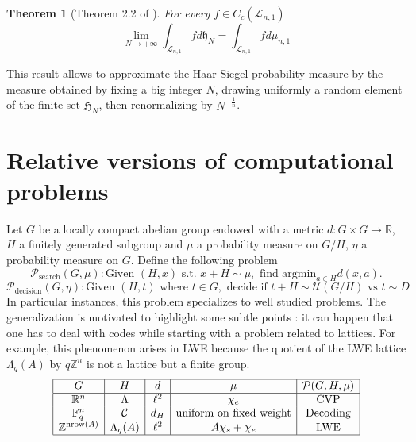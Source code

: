 \documentclass{article}
\newtheorem{theorem}{Theorem}
\begin{document}
\begin{theorem}[Theorem 2.2 of \cite{goldstein2003equidistribution}]
For every $f\in C_c(\mathcal L_{n,1})$
\[\lim_{N\rightarrow +\infty} \int_{\mathcal L_{n,1}} f d\mathfrak h_{N} = \int_{\mathcal L_{n,1}} fd\mu_{n,1}\]
\end{theorem}

This result allows to approximate the Haar-Siegel probability measure by the measure obtained by fixing a big integer $N$, drawing uniformly a random element of the finite set $\mathfrak H_N$, then renormalizing by $N^{-\frac{1}{n}}$.

\section{Relative versions of computational problems}%

Let $G$ be a locally compact abelian group endowed with a metric $d : G\times G \rightarrow \mathbb R$, $H$ a finitely generated subgroup and $\mu$ a probability measure on $G/H$, $\eta$ a probability measure on $G$. Define the following problem
$$\mathcal P_{\text{search}} (G,\mu) : \text{Given } (H,x) \text{ s.t. }x+H \sim \mu , \text{ find argmin}_{a\in H} d(x,a).$$
$$\mathcal P_{\text{decision}}(G,\eta) : \text{Given } (H,t) \text{ where } t\in G, \text{ decide if } t + H \sim \mathcal U(G/H) \text{ vs } t\sim D$$
In particular instances, this problem specializes to well studied problems. The generalization is motivated to highlight some subtle points : it can happen that one has to deal with codes while starting with a problem related to lattices. For example, this phenomenon arises in LWE because the quotient of the LWE lattice $\Lambda_q(A)$ by $q\mathbb Z^n$ is not a lattice but a finite group. 
\[\begin{array}{|c|c|c| c | c|} 
\hline
G             & H                          & d     &  \mu              & \mathcal P (G,H,\mu)\\
\hline
\mathbb R^n   & \Lambda                    & \ell^2 & \chi_e            & \text{CVP}     \\
\mathbb F_q^n & \mathcal C                 & d_H    & \text{uniform on fixed weight}    & \text{Decoding}\\
\mathbb Z^{\text{nrow}(A)}  & \Lambda_q(A) & \ell^2 &  A \chi_s +\chi_e & \text{LWE}     \\
\hline
\end{array}\]
\end{document}
